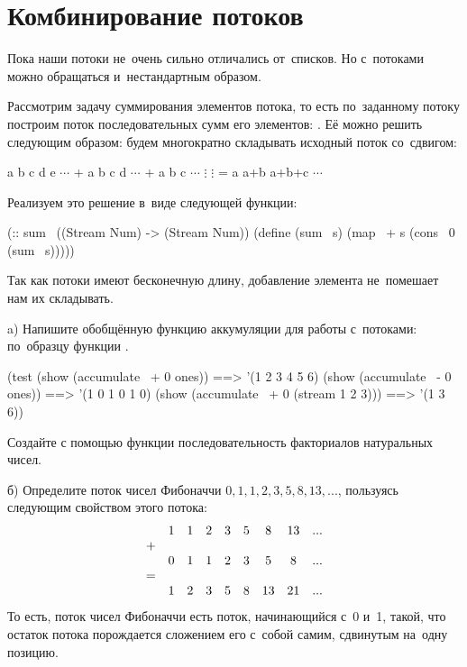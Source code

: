 \section{Комбинирование потоков}%
Пока наши потоки не~очень сильно отличались от~списков. Но с~потоками можно обращаться и~нестандартным образом.

Рассмотрим задачу суммирования элементов потока, то есть по~заданному потоку  построим поток последовательных сумм его элементов: . Её можно решить следующим образом: будем многократно складывать исходный поток со~сдвигом:
\begin{SchemeCode}
  a  b  c  d  e $\cdots$
+    a  b  c  d $\cdots$
+       a  b  c $\cdots$
$\vdots$       $\vdots$
= a a+b a+b+c $\cdots$
\end{SchemeCode}

Реализуем это решение в~виде следующей функции:

\begin{Definition}[emph={s}]
(:: sum~ ((Stream Num) -> (Stream Num))
 (define (sum~ s)
   (map~ + s (cons~ 0 (sum~ s)))))
\end{Definition}

\noindent Так как потоки имеют бесконечную длину, добавление элемента не~помешает нам их складывать.

\newpage
\begin{Assignment}

a) Напишите обобщённую функцию аккумуляции для работы с~потоками: по~образцу функции .

\begin{Specification}
(test 
  (show (accumulate~ + 0 ones))           ==> '(1 2 3 4 5 6)
  (show (accumulate~ - 0 ones))           ==> '(1 0 1 0 1 0)
  (show (accumulate~ + 0 (stream 1 2 3))) ==> '(1 3 6))
\end{Specification}

Создайте с помощью функции  последовательность факториалов натуральных чисел.

б) Определите поток чисел Фибоначчи $0,1,1,2,3,5,8,13,...$, пользуясь следующим свойством этого потока:
$$
\begin{array}{ccccccccc}
  & 1 & 1 & 2 & 3 & 5 & 8 & 13 & ...\\
+\\
  & 0 & 1 & 1 & 2 & 3 & 5 & 8 & ...\\
=\\
  & 1 & 2 & 3 & 5 & 8 & 13 & 21& ...\\
\end{array}
$$
То есть, поток чисел Фибоначчи есть поток, начинающийся с~0 и~1, такой, что остаток потока порождается сложением его с~собой самим, сдвинутым на~одну позицию.
\end{Assignment}

